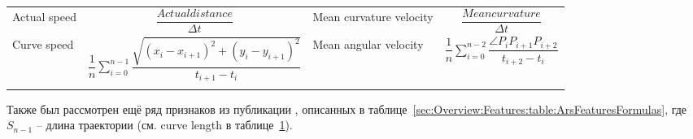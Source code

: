\documentclass[12pt]{article}
\begin{document}
\begin{table}[h]
\begin{tabular}[c]{ || m{20mm} | c || m{20mm} | c ||}
            \hhline{||-|-||-|-||}
            Actual speed & {\centering $\dfrac{Actualdistance}{\Delta t}$} &
            Mean curvature velocity & {\centering $\dfrac{Meancurvature}{\Delta t}$} \\
            \hhline{||-|-||-|-||}
            Curve speed & {\centering $\dfrac{1}{n} \sum_{i=0}^{n-1} \dfrac{\sqrt{(x_i-x_{i+1})^2 + (y_i-y_{i+1})^2}}{t_{i+1} - t_i}$} &
            Mean angular velocity & {\centering $\dfrac{1}{n} \sum_{i=0}^{n-2} \dfrac{\angle P_i P_{i+1} P_{i+2}}{t_{i+2} - t_i}$} \\
            \hhline{|b:==:b:==:b|} 
        \end{tabular}
        \label{sec:Overview:Features:table:FeaturesFormulas}
    \end{table}

    \par Также был рассмотрен ещё ряд признаков из публикации \cite{ArsFeature}, описанных в таблице~\ref{sec:Overview:Features:table:ArsFeaturesFormulas}, где $S_{n-1}$ -- длина траектории (см. curve length в таблице~\ref{sec:Overview:Features:table:FeaturesFormulas}).
    
\end{document}
